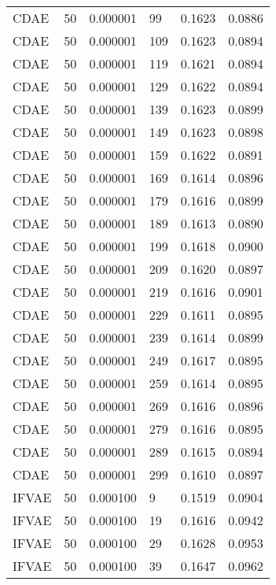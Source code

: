 \begin{tabular}{llrlrr}
    CDAE &   50 &  0.000001 &    99 &  0.1623 &       0.0886 \\
    CDAE &   50 &  0.000001 &   109 &  0.1623 &       0.0894 \\
    CDAE &   50 &  0.000001 &   119 &  0.1621 &       0.0894 \\
    CDAE &   50 &  0.000001 &   129 &  0.1622 &       0.0894 \\
    CDAE &   50 &  0.000001 &   139 &  0.1623 &       0.0899 \\
    CDAE &   50 &  0.000001 &   149 &  0.1623 &       0.0898 \\
    CDAE &   50 &  0.000001 &   159 &  0.1622 &       0.0891 \\
    CDAE &   50 &  0.000001 &   169 &  0.1614 &       0.0896 \\
    CDAE &   50 &  0.000001 &   179 &  0.1616 &       0.0899 \\
    CDAE &   50 &  0.000001 &   189 &  0.1613 &       0.0890 \\
    CDAE &   50 &  0.000001 &   199 &  0.1618 &       0.0900 \\
    CDAE &   50 &  0.000001 &   209 &  0.1620 &       0.0897 \\
    CDAE &   50 &  0.000001 &   219 &  0.1616 &       0.0901 \\
    CDAE &   50 &  0.000001 &   229 &  0.1611 &       0.0895 \\
    CDAE &   50 &  0.000001 &   239 &  0.1614 &       0.0899 \\
    CDAE &   50 &  0.000001 &   249 &  0.1617 &       0.0895 \\
    CDAE &   50 &  0.000001 &   259 &  0.1614 &       0.0895 \\
    CDAE &   50 &  0.000001 &   269 &  0.1616 &       0.0896 \\
    CDAE &   50 &  0.000001 &   279 &  0.1616 &       0.0895 \\
    CDAE &   50 &  0.000001 &   289 &  0.1615 &       0.0894 \\
    CDAE &   50 &  0.000001 &   299 &  0.1610 &       0.0897 \\
   IFVAE &   50 &  0.000100 &     9 &  0.1519 &       0.0904 \\
   IFVAE &   50 &  0.000100 &    19 &  0.1616 &       0.0942 \\
   IFVAE &   50 &  0.000100 &    29 &  0.1628 &       0.0953 \\
   IFVAE &   50 &  0.000100 &    39 &  0.1647 &       0.0962 \\

\end{tabular}
